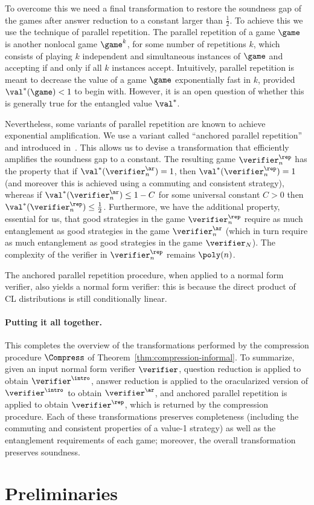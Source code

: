 To overcome this we need a final transformation to restore the soundness gap of the games after answer reduction to a constant larger than $\frac{1}{2}$. To achieve this we use the technique of {parallel repetition}. The parallel repetition of a game $\game$ is another nonlocal game $\game^k$, for some number of repetitions $k$, which consists of playing $k$ independent and simultaneous instances of $\game$ and accepting if and only if all $k$ instances accept. Intuitively, parallel repetition is meant to decrease the value of a game $\game$ exponentially fast in $k$, provided $\val^*(\game) < 1$ to begin with. However, it is an open question of whether this is generally true for the entangled value $\val^*$. 

Nevertheless, some variants of parallel repetition are known to achieve exponential amplification. We use  a variant  called ``anchored parallel repetition'' and introduced in~\cite{bavarian2017hardness}. This allows us to devise a transformation that efficiently amplifies the soundness gap to a constant. The resulting game $\verifier^\rep_n$ has the property that if $\val^*(\verifier^\ar_n) = 1$, then $\val^*(\verifier^\rep_n) = 1$ (and moreover this is achieved using a commuting and consistent strategy), whereas if $\val^*(\verifier^\ar_n) \leq 1 - C$ for some universal constant $C > 0$ then $\val^*(\verifier^\rep_n) \leq \frac{1}{2}$. Furthermore, we have the additional property, essential for us, that good strategies in the game $\verifier^\rep_n$ require as much entanglement as good strategies in the game $\verifier^\ar_n$ (which in turn require as much entanglement as good strategies in the game $\verifier_N$). The complexity of the verifier in $\verifier^\rep_n$ remains $\poly(n)$.

The anchored parallel repetition procedure, when applied to a normal form verifier, also yields a normal form verifier: this is because the direct product of CL distributions is still conditionally linear. 


\paragraph{Putting it all together.} This completes the overview of the transformations performed by the compression procedure $\Compress$ of Theorem~\ref{thm:compression-informal}. To summarize, given an input normal form verifier $\verifier$, question reduction is applied to obtain $\verifier^\intro$, answer reduction is applied to the oracularized version of $\verifier^\intro$ to obtain $\verifier^\ar$, and  anchored parallel repetition is applied to obtain $\verifier^\rep$, which is returned by the compression procedure. Each of these transformations preserves completeness (including the commuting and consistent properties of a value-1 strategy) as well as the entanglement requirements of each game; moreover, the overall transformation preserves soundness. 
 
\section{Preliminaries}
